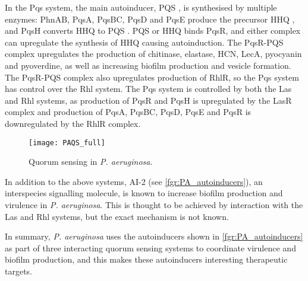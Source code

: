 In the Pqs system, the main autoinducer, PQS \cite{Pesci1999}, is synthesised by multiple enzymes:
PhnAB\cite{Farrow2007}, PqsA, PqsBC, PqsD\cite{Lepine2003,Lepine2004} and PqsE\cite{Drees2015,Lin2018} produce the precursor HHQ , and PqsH converts HHQ  to PQS . 
PQS \cite{Wade2005} or HHQ  binds PqsR\cite{Xiao2006}, and either complex can upregulate the synthesis of HHQ  causing autoinduction. 
The PqsR-PQS complex upregulates the production of 
chitinase\cite{Deziel2005}, elastase\cite{Pesci1999}, HCN\cite{Deziel2005}, LecA\cite{Diggle2003}, pyocyanin\cite{Gallagher2002,Diggle2007} and pyoverdine\cite{Diggle2007}, as well as increasing biofilm production\cite{Diggle2003} and vesicle formation\cite{Mashburn2009}.
The PqsR-PQS complex also upregulates production of RhlR, so the Pqs system has control over the Rhl system\cite{McKnight2000}.
The Pqs system is controlled by both the Las and Rhl systems,
as production of PqsR\cite{Wade2005} and PqsH\cite{Gallagher2002} is upregulated by the LasR complex and 
production of PqsA, PqsBC, PqsD, PqsE\cite{McGrath2004} and PqsR\cite{Wade2005} is downregulated by the RhlR complex.


\begin{figure}[H]
	\begin{center}
		\texttt{[image: PAQS\_full]}
		\caption{Quorum sensing in \textit{P. aeruginosa}\cite{Dubern2008,Hodgkinson2011,Jimenez2012}. \label{fgr:PA_QS}}
	\end{center}
\end{figure}


In addition to the above systems, AI-2 (see \ref{fgr:PA_autoinducers}), an interspecies signalling molecule\cite{Pereira2013}, is known to increase biofilm production and virulence in \textit{P. aeruginosa}\cite{Li2015a,Li2017}. This is thought to be achieved by interaction with the Las and Rhl systems, but the exact mechanism is not known.

In summary, \textit{P. aeruginosa} uses the autoinducers shown in \ref{fgr:PA_autoinducers} as part of three interacting quorum sensing systems to coordinate virulence and biofilm production, and this makes these autoinducers interesting therapeutic targets. 


